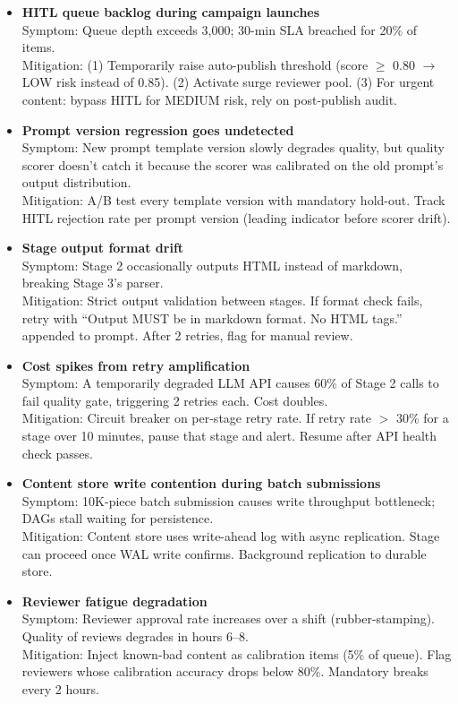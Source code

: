 \begin{itemize}
  \item \textbf{HITL queue backlog during campaign launches}\\
    Symptom: Queue depth exceeds 3,000; 30-min SLA breached for 20\% of items.\\
    Mitigation: (1) Temporarily raise auto-publish threshold (score $\geq$ 0.80 $\rightarrow$ LOW risk instead of 0.85). (2) Activate surge reviewer pool. (3) For urgent content: bypass HITL for MEDIUM risk, rely on post-publish audit.

  \item \textbf{Prompt version regression goes undetected}\\
    Symptom: New prompt template version slowly degrades quality, but quality scorer doesn't catch it because the scorer was calibrated on the old prompt's output distribution.\\
    Mitigation: A/B test every template version with mandatory hold-out. Track HITL rejection rate per prompt version (leading indicator before scorer drift).

  \item \textbf{Stage output format drift}\\
    Symptom: Stage 2 occasionally outputs HTML instead of markdown, breaking Stage 3's parser.\\
    Mitigation: Strict output validation between stages. If format check fails, retry with ``Output MUST be in markdown format. No HTML tags.'' appended to prompt. After 2 retries, flag for manual review.

  \item \textbf{Cost spikes from retry amplification}\\
    Symptom: A temporarily degraded LLM API causes 60\% of Stage 2 calls to fail quality gate, triggering 2 retries each. Cost doubles.\\
    Mitigation: Circuit breaker on per-stage retry rate. If retry rate $>$ 30\% for a stage over 10 minutes, pause that stage and alert. Resume after API health check passes.

  \item \textbf{Content store write contention during batch submissions}\\
    Symptom: 10K-piece batch submission causes write throughput bottleneck; DAGs stall waiting for persistence.\\
    Mitigation: Content store uses write-ahead log with async replication. Stage can proceed once WAL write confirms. Background replication to durable store.

  \item \textbf{Reviewer fatigue degradation}\\
    Symptom: Reviewer approval rate increases over a shift (rubber-stamping). Quality of reviews degrades in hours 6--8.\\
    Mitigation: Inject known-bad content as calibration items (5\% of queue). Flag reviewers whose calibration accuracy drops below 80\%. Mandatory breaks every 2 hours.
\end{itemize}

